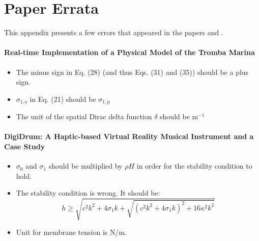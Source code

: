 \chapter{Paper Errata}\label{app:paperErrata}
This appendix presents a few errors that appeared in the papers \citeP[D] and \citeP[F].
\subsubsection{Real-time Implementation of a Physical Model of the Tromba Marina \citeP[D]}
\begin{itemize}
    \item The minus sign in Eq. (28) (and thus Eqs. (31) and (35)) should be a plus sign.
    \item $\sigma_{1,\text{s}}$ in Eq. (21) should be $\sigma_{1,\text{p}}$
    \item The unit of the spatial Dirac delta function $\delta$ should be m$^{-1}$
\end{itemize}
%
\subsubsection{DigiDrum: A Haptic-based Virtual Reality Musical Instrument and a Case Study \citeP[F]}
\begin{itemize}
    \item $\sigma_0$ and $\sigma_1$ should be multiplied by $\rho H$ in order for the stability condition to hold.
    \item The stability condition is wrong. It should be: 
    \begin{equation}
        h \geq \sqrt{c^2k^2 + 4\sigma_1k + \sqrt{(c^2k^2+4\sigma_1k)^2 + 16\kappa^2k^2}}
    \end{equation}
    \item Unit for membrane tension is N/m.
\end{itemize}
